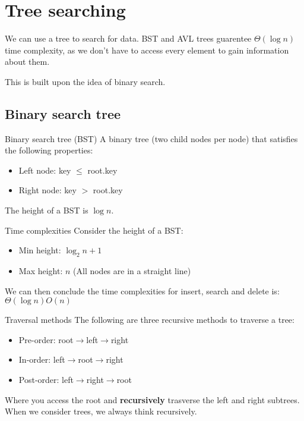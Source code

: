 \section{Tree searching}

We can use a tree to search for data. BST and AVL trees guarentee $\Theta(\log n)$ time complexity, as we don't have to access every element to gain information about them.

This is built upon the idea of binary search.

\subsection{Binary search tree}

\begin{definition}
    {Binary search tree (BST)}
    A binary tree (two child nodes per node) that satisfies the following properties:
    \begin{itemize}
        \item Left node: key $\leq$ root.key
        \item Right node: key $>$ root.key
    \end{itemize}
    The height of a BST is $\log n$.
\end{definition}

\begin{theorem}
    {Time complexities}
    Consider the height of a BST:
    \begin{itemize}
        \item Min height: $\log_2 n + 1$
        \item Max height: $n$ (All nodes are in a straight line)
    \end{itemize}
    We can then conclude the time complexities for insert, search and delete is: $\Theta(\log n) O(n)$
\end{theorem}

\begin{theorem}
    {Traversal methods}
    The following are three recursive methods to traverse a tree:
    \begin{itemize}
        \item Pre-order: root$\to$left$\to$right
        \item In-order: left$\to$root$\to$right
        \item Post-order: left$\to$right$\to$root
    \end{itemize}
    Where you access the root and \textbf{recursively} trasverse the left and right subtrees. When we consider trees, we always think recursively.
\end{theorem}


